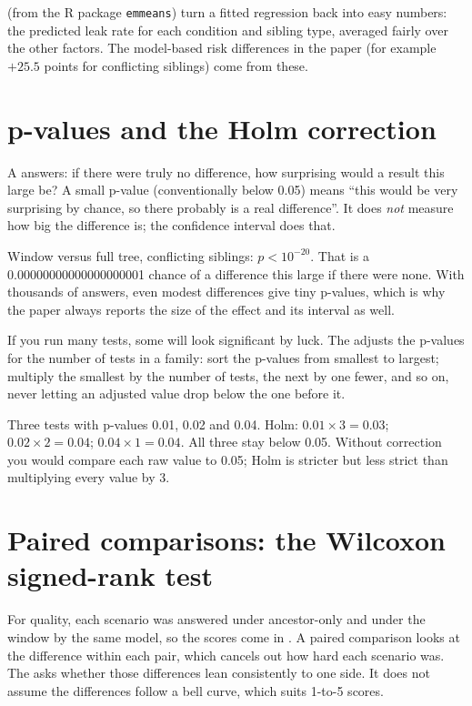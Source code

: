  (from the R package \texttt{emmeans}) turn a fitted regression back into easy numbers: the predicted leak rate for each condition and sibling type, averaged fairly over the other factors. The model-based risk differences in the paper (for example $+25.5$ points for conflicting siblings) come from these.

\section{p-values and the Holm correction}

A  answers: if there were truly no difference, how surprising would a result this large be? A small p-value (conventionally below 0.05) means ``this would be very surprising by chance, so there probably is a real difference''. It does \emph{not} measure how big the difference is; the confidence interval does that.

\begin{example}
Window versus full tree, conflicting siblings: $p < 10^{-20}$. That is a 0.00000000000000000001 chance of a difference this large if there were none. With thousands of answers, even modest differences give tiny p-values, which is why the paper always reports the size of the effect and its interval as well.
\end{example}

 If you run many tests, some will look significant by luck. The  adjusts the p-values for the number of tests in a family: sort the p-values from smallest to largest; multiply the smallest by the number of tests, the next by one fewer, and so on, never letting an adjusted value drop below the one before it.

\begin{example}
Three tests with p-values 0.01, 0.02 and 0.04. Holm: $0.01 \times 3 = 0.03$; $0.02 \times 2 = 0.04$; $0.04 \times 1 = 0.04$. All three stay below 0.05. Without correction you would compare each raw value to 0.05; Holm is stricter but less strict than multiplying every value by 3.
\end{example}

\section{Paired comparisons: the Wilcoxon signed-rank test}

For quality, each scenario was answered under ancestor-only and under the window by the same model, so the scores come in . A paired comparison looks at the difference within each pair, which cancels out how hard each scenario was. The  asks whether those differences lean consistently to one side. It does not assume the differences follow a bell curve, which suits 1-to-5 scores.

